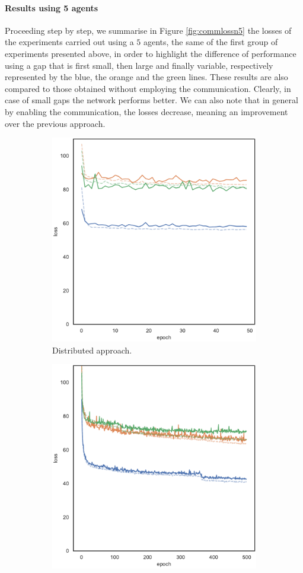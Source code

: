 \paragraph*{Results using 5 agents}
Proceeding step by step, we summarise in Figure \ref{fig:commlossn5} the losses 
of the experiments carried out using a $5$ agents, the same of the first group of 
experiments presented above, in order to highlight the difference of performance 
using a gap that is first small, then large and finally variable, respectively 
represented by the blue, the orange and the green lines.
These results are also compared to those obtained without employing the 
communication.
Clearly, in case of small gaps the network performs better. We can also note that 
in general by enabling the communication, the losses decrease, meaning an 
improvement over the previous approach.
\begin{figure}[!htb]
	\begin{center}
		\begin{subfigure}[h]{0.49\textwidth}
			\centering
			\includegraphics[width=.7\textwidth]{contents/images/task1-comm-extension/loss-distributed-N5@copy}
			\caption{Distributed approach.}
		\end{subfigure}
		\hfill
		\begin{subfigure}[h]{0.49\textwidth}
			\centering
			\includegraphics[width=.7\textwidth]{contents/images/task1-comm-extension/loss-communication-N5@copy}

\end{subfigure}
\end{center}
\end{figure}
